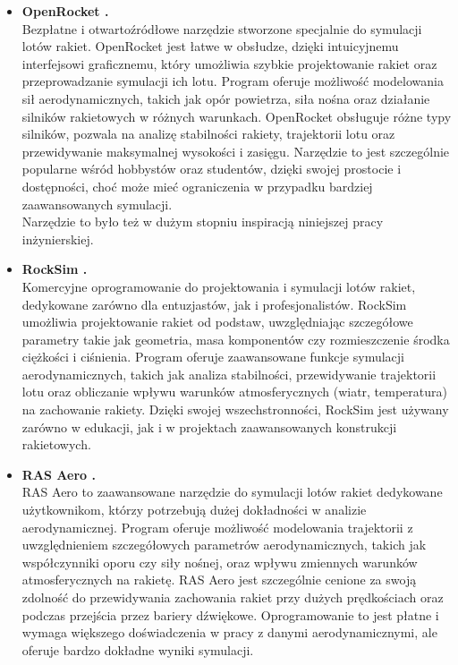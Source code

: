 \begin{itemize}

    \item \textbf{OpenRocket \cite{openrocket}.}
    \\Bezpłatne i otwartoźródłowe narzędzie stworzone specjalnie do symulacji lotów rakiet. OpenRocket jest łatwe w obsłudze, dzięki intuicyjnemu interfejsowi graficznemu, który umożliwia szybkie projektowanie rakiet oraz przeprowadzanie symulacji ich lotu. Program oferuje możliwość modelowania sił aerodynamicznych, takich jak opór powietrza, siła nośna oraz działanie silników rakietowych w różnych warunkach.
    OpenRocket obsługuje różne typy silników, pozwala na analizę stabilności rakiety, trajektorii lotu oraz przewidywanie maksymalnej wysokości i zasięgu. Narzędzie to jest szczególnie popularne wśród hobbystów oraz studentów, dzięki swojej prostocie i dostępności, choć może mieć ograniczenia w przypadku bardziej zaawansowanych symulacji.
    \\Narzędzie to było też w dużym stopniu inspiracją niniejszej pracy
    inżynierskiej\cite{niskanen2013openrocket}.


    \item \textbf{RockSim \cite{rocksim}.}
    \\Komercyjne oprogramowanie do projektowania i symulacji lotów rakiet, dedykowane zarówno dla entuzjastów, jak i profesjonalistów. RockSim umożliwia projektowanie rakiet od podstaw, uwzględniając szczegółowe parametry takie jak geometria, masa komponentów czy rozmieszczenie środka ciężkości i ciśnienia.
    Program oferuje zaawansowane funkcje symulacji aerodynamicznych, takich jak analiza stabilności, przewidywanie trajektorii lotu oraz obliczanie wpływu warunków atmosferycznych (wiatr, temperatura) na zachowanie rakiety. Dzięki swojej wszechstronności, RockSim jest używany zarówno w edukacji, jak i w projektach zaawansowanych konstrukcji rakietowych.


    \item \textbf{RAS Aero \cite{rasaero}.}
    \\RAS Aero to zaawansowane narzędzie do symulacji lotów rakiet dedykowane użytkownikom, którzy potrzebują dużej dokładności w analizie aerodynamicznej. Program oferuje możliwość modelowania trajektorii z uwzględnieniem szczegółowych parametrów aerodynamicznych, takich jak współczynniki oporu czy siły nośnej, oraz wpływu zmiennych warunków atmosferycznych na rakietę.
    RAS Aero jest szczególnie cenione za swoją zdolność do przewidywania zachowania rakiet przy dużych prędkościach oraz podczas przejścia przez bariery dźwiękowe. Oprogramowanie to jest płatne i wymaga większego doświadczenia w pracy z danymi aerodynamicznymi, ale oferuje bardzo dokładne wyniki symulacji.


\end{itemize}

